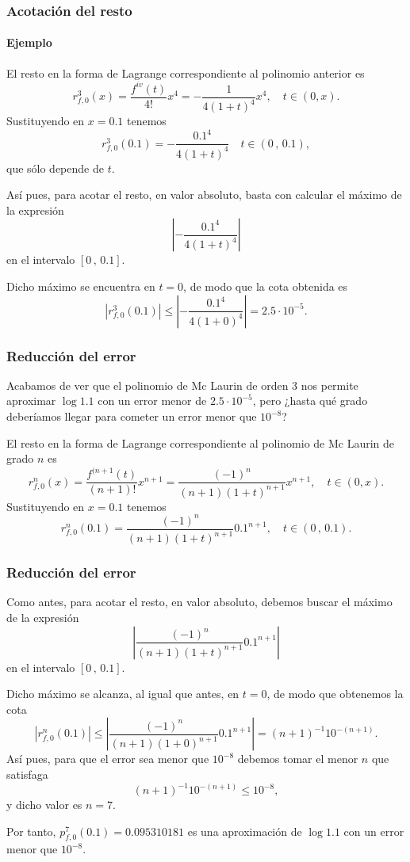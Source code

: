 \begin{frame}
\frametitle{Acotación del resto}
\framesubtitle{Ejemplo}
El resto en la forma de Lagrange correspondiente al polinomio anterior es
\[
r_{f,0}^3(x)=\frac{f^{iv}(t)}{4!}x^4=-\frac{1}{4(1+t)^4}x^4,\quad t\in(0,x).
\]
Sustituyendo en $x=0.1$ tenemos
\[
r_{f,0}^3(0.1)=-\frac{0.1^4}{4(1+t)^4}\quad t\in(0\,,\,0.1),
\]
que sólo depende de $t$.

Así pues, para acotar el resto, en valor absoluto, basta con calcular el máximo de la expresión
\[
\left|
-\frac{0.1^4}{4(1+t)^4}
\right|
\]
en el intervalo $[0\,,\,0.1]$.

Dicho máximo se encuentra en $t=0$, de modo que la cota obtenida es
\[
\left|r_{f,0}^3(0.1)\right|\leq
\left| -\frac{0.1^4}{4(1+0)^4} \right| =2.5\cdot 10^{-5}.
\]
\end{frame}


\begin{frame}
\frametitle{Reducción del error}
Acabamos de ver que el polinomio de Mc Laurin de orden 3 nos permite aproximar $\log 1.1$ con un error menor de
$2.5\cdot 10^{-5}$, pero ¿hasta qué grado deberíamos llegar para cometer un error menor que $10^{-8}$? 

El resto en la forma de Lagrange correspondiente al polinomio de Mc Laurin de grado $n$ es
\[
r_{f,0}^n(x)=\frac{f^{(n+1}(t)}{(n+1)!}x^{n+1}=\frac{(-1)^n}{(n+1)(1+t)^{n+1}}x^{n+1},\quad t\in(0,x).
\]
Sustituyendo en $x=0.1$ tenemos
\[
r_{f,0}^n(0.1)=\frac{(-1)^n}{(n+1)(1+t)^{n+1}}0.1^{n+1},\quad t\in(0\,,\,0.1).
\]
\end{frame}


\begin{frame}
\frametitle{Reducción del error}
Como antes, para acotar el resto, en valor absoluto, debemos buscar el máximo de la expresión
\[
\left|
\frac{(-1)^n}{(n+1)(1+t)^{n+1}}0.1^{n+1}
\right|
\]
en el intervalo $[0\,,\,0.1]$.

Dicho máximo se alcanza, al igual que antes, en $t=0$, de modo que obtenemos la cota
\[
\left|r_{f,0}^n(0.1)\right|\leq
\left|\frac{(-1)^n}{(n+1)(1+0)^{n+1}}0.1^{n+1} \right| =(n+1)^{-1} 10^{-(n+1)}.
\]
Así pues, para que el error sea menor que $10^{-8}$ debemos tomar el menor $n$ que satisfaga
\[
(n+1)^{-1} 10^{-(n+1)}\leq 10^{-8},
\]
y dicho valor es $n=7$.

Por tanto, $p_{f,0}^7(0.1)=0.095310181$ es una aproximación de $\log 1.1$ con un error menor que $10^{-8}$.
\end{frame} 